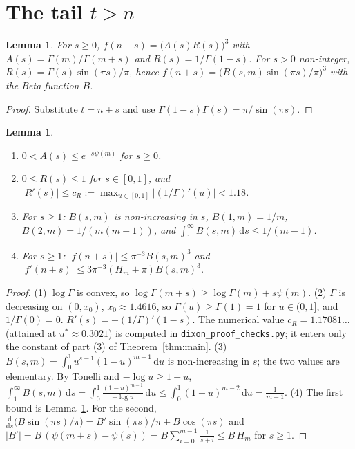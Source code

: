\documentclass[11pt]{amsart}
\newtheorem{lemma}[theorem]{Lemma}
\theoremstyle{remark}
\newcommand{\dd}{\,\mathrm{d}}
\begin{document}
\section{The tail \texorpdfstring{$t>n$}{t>n}}

\begin{lemma}\label{lem:tailrep}
For $s\ge0$, $f(n+s)=\bigl(A(s)R(s)\bigr)^3$ with $A(s)=\Gamma(m)/\Gamma(m+s)$ and $R(s)=1/\Gamma(1-s)$.
For $s>0$ non-integer, $R(s)=\Gamma(s)\sin(\pi s)/\pi$, hence $f(n+s)=\bigl(B(s,m)\sin(\pi s)/\pi\bigr)^3$ with the Beta function $B$.
\end{lemma}
\begin{proof}
Substitute $t=n+s$ and use $\Gamma(1-s)\Gamma(s)=\pi/\sin(\pi s)$.
\end{proof}

\begin{lemma}\label{lem:bounds}
\begin{enumerate}
\item $0<A(s)\le e^{-s\psi(m)}$ for $s\ge0$.
\item $0\le R(s)\le1$ for $s\in[0,1]$, and $|R'(s)|\le c_R:=\max_{u\in[0,1]}|(1/\Gamma)'(u)|<1.18$.
\item For $s\ge1$: $B(s,m)$ is non-increasing in $s$, $B(1,m)=1/m$, $B(2,m)=1/(m(m+1))$, and $\int_1^\infty B(s,m)\dd s\le 1/(m-1)$.
\item For $s\ge1$: $|f(n+s)|\le\pi^{-3}B(s,m)^3$ and $|f'(n+s)|\le 3\pi^{-3}(H_m+\pi)B(s,m)^3$.
\end{enumerate}
\end{lemma}

\begin{proof}
(1) $\log\Gamma$ is convex, so $\log\Gamma(m+s)\ge\log\Gamma(m)+s\psi(m)$.
(2) $\Gamma$ is decreasing on $(0,x_0)$, $x_0\approx1.4616$, so $\Gamma(u)\ge\Gamma(1)=1$ for $u\in(0,1]$, and $1/\Gamma(0)=0$.
$R'(s)=-(1/\Gamma)'(1-s)$. The numerical value $c_R=1.17081\ldots$ (attained at $u^*\approx0.3021$) is computed in \texttt{dixon\_proof\_checks.py};
it enters only the constant of part (3) of Theorem~\ref{thm:main}.
(3) $B(s,m)=\int_0^1u^{s-1}(1-u)^{m-1}\dd u$ is non-increasing in $s$; the two values are elementary. By Tonelli and $-\log u\ge1-u$,
$\int_1^\infty B(s,m)\dd s=\int_0^1\frac{(1-u)^{m-1}}{-\log u}\dd u\le\int_0^1(1-u)^{m-2}\dd u=\frac1{m-1}$.
(4) The first bound is Lemma~\ref{lem:tailrep}. For the second,
$\frac{\mathrm d}{\mathrm ds}\bigl(B\sin(\pi s)/\pi\bigr)=B'\sin(\pi s)/\pi+B\cos(\pi s)$ and
$|B'|=B\,(\psi(m+s)-\psi(s))=B\sum_{i=0}^{m-1}\frac1{s+i}\le B\,H_m$ for $s\ge1$.
\end{proof}
\end{document}
